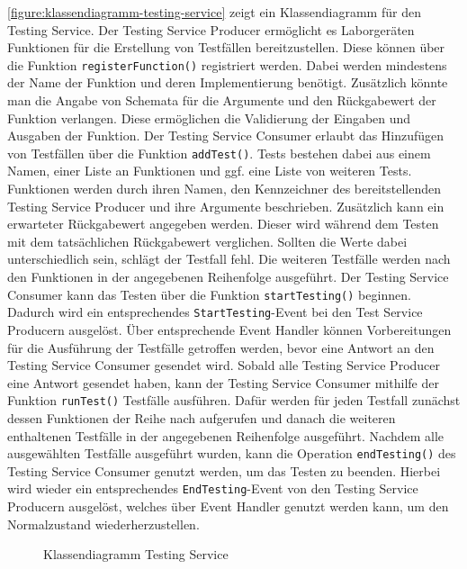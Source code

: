 \autoref{figure:klassendiagramm-testing-service} zeigt ein Klassendiagramm für den Testing Service. Der Testing Service Producer ermöglicht es Laborgeräten Funktionen für die Erstellung von Testfällen bereitzustellen. Diese können über die Funktion \texttt{registerFunction()} registriert werden. Dabei werden mindestens der Name der Funktion und deren Implementierung benötigt. Zusätzlich könnte man die Angabe von Schemata für die Argumente und den Rückgabewert der Funktion verlangen. Diese ermöglichen die Validierung der Eingaben und Ausgaben der Funktion. Der Testing Service Consumer erlaubt das Hinzufügen von Testfällen über die Funktion \texttt{addTest()}. Tests bestehen dabei aus einem Namen, einer Liste an Funktionen und ggf. eine Liste von weiteren Tests. Funktionen werden durch ihren Namen, den Kennzeichner des bereitstellenden Testing Service Producer und ihre Argumente beschrieben. Zusätzlich kann ein erwarteter Rückgabewert angegeben werden. Dieser wird während dem Testen mit dem tatsächlichen Rückgabewert verglichen. Sollten die Werte dabei unterschiedlich sein, schlägt der Testfall fehl. Die weiteren Testfälle werden nach den Funktionen in der angegebenen Reihenfolge ausgeführt. Der Testing Service Consumer kann das Testen über die Funktion \texttt{startTesting()} beginnen. Dadurch wird ein entsprechendes \texttt{StartTesting}-Event bei den Test Service Producern ausgelöst. Über entsprechende Event Handler können Vorbereitungen für die Ausführung der Testfälle getroffen werden, bevor eine Antwort an den Testing Service Consumer gesendet wird. Sobald alle Testing Service Producer eine Antwort gesendet haben, kann der Testing Service Consumer mithilfe der Funktion \texttt{runTest()} Testfälle ausführen. Dafür werden für jeden Testfall zunächst dessen Funktionen der Reihe nach aufgerufen und danach die weiteren enthaltenen Testfälle in der angegebenen Reihenfolge ausgeführt. Nachdem alle ausgewählten Testfälle ausgeführt wurden, kann die Operation \texttt{endTesting()} des Testing Service Consumer genutzt werden, um das Testen zu beenden. Hierbei wird wieder ein entsprechendes \texttt{EndTesting}-Event von den Testing Service Producern ausgelöst, welches über Event Handler genutzt werden kann, um den Normalzustand wiederherzustellen.

\begin{figure}[tbp]
    \centering
    \caption{Klassendiagramm Testing Service}
    \label{figure:klassendiagramm-testing-service}
\end{figure}

